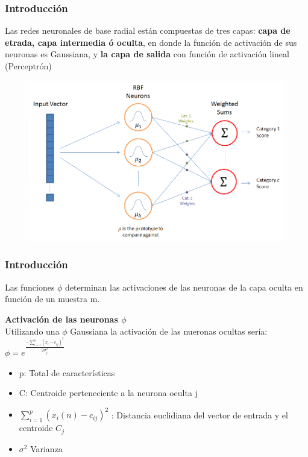 \documentclass[
	11pt, %
]{beamer}
\begin{document}

\begin{frame}
  \frametitle{Introducción}

  \bigskip %
  
  Las redes neuronales de base radial están compuestas de tres capas: \textbf{capa de etrada, capa intermedia ó oculta}, en donde la función de activación de sus neuronas es Gaussiana, y \textbf{la capa de salida} con función de activación lineal (Perceptrón)

  \bigskip %
  
  \begin{figure}
    \includegraphics[width=0.6\linewidth]{architecture_simple2.png}
  \end{figure}
  
\end{frame}

\begin{frame}
  \frametitle{Introducción}

  Las funciones $\phi$ determinan las activaciones de las neuronas de la capa oculta en función de un muestra m.

  \bigskip %
  
  \textbf{Activación de las neuronas $\phi$}\\

  Utilizando una $\phi$ Gaussiana la activación de las nueronas ocultas sería: $\phi = e^{\frac{-\sum_{i=1} ^{p} (x_{i}-c_{ij})^{2}}{2\sigma^{2}_{j}}}$

  \bigskip %
  
  \begin{itemize}
  \item p: Total de características
  \item C: Centroide perteneciente a la neurona oculta j
  \item $\sum_{i=1} ^{p} (x_{i}(n)-c_{ij})^{2}$ : Distancia euclidiana del vector de entrada y el centroide $C_{j}$
  \item $\sigma^{2}$ Varianza
  \end{itemize}
\end{frame}
\end{document}
